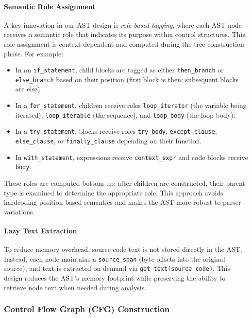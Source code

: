 \paragraph{Semantic Role Assignment}

A key innovation in our AST design is \emph{role-based tagging}, where each AST node receives a semantic role that indicates its purpose within control structures. This role assignment is context-dependent and computed during the tree construction phase. For example:

\begin{itemize}
    \item In an \texttt{if\_statement}, child blocks are tagged as either \texttt{then\_branch} or \texttt{else\_branch} based on their position (first block is then; subsequent blocks are else).
    \item In a \texttt{for\_statement}, children receive roles \texttt{loop\_iterator} (the variable being iterated), \texttt{loop\_iterable} (the sequence), and \texttt{loop\_body} (the loop body).
    \item In a \texttt{try\_statement}, blocks receive roles \texttt{try\_body}, \texttt{except\_clause}, \texttt{else\_clause}, or \texttt{finally\_clause} depending on their function.
    \item In \texttt{with\_statement}, expressions receive \texttt{context\_expr} and code blocks receive \texttt{body}.
\end{itemize}

These roles are computed bottom-up: after children are constructed, their parent type is examined to determine the appropriate role. This approach avoids hardcoding position-based semantics and makes the AST more robust to parser variations.

\paragraph{Lazy Text Extraction}

To reduce memory overhead, source code text is not stored directly in the AST. Instead, each node maintains a \texttt{source\_span} (byte offsets into the original source), and text is extracted on-demand via \texttt{get\_text(source\_code)}. This design reduces the AST's memory footprint while preserving the ability to retrieve node text when needed during analysis.

\subsubsection{Control Flow Graph (CFG) Construction}

